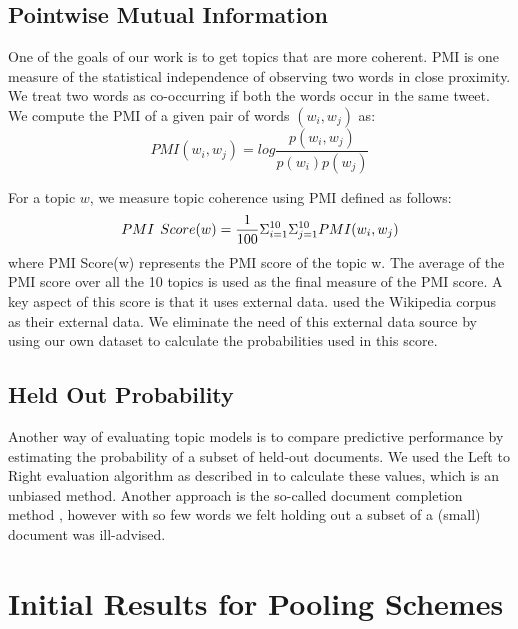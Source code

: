 \documentclass{sig-alternate}
\begin{document}
\subsection{Pointwise Mutual Information}

One of the goals of our work is to get topics that are more coherent. 
PMI is one measure of the statistical independence of observing  two words in close proximity. We treat two words as co-occurring if both the words occur in the same tweet. We compute the PMI of a given pair of words $(w_i, w_j)$ as:
\begin{equation}
PMI (w_i,w_j) = log \frac{p(w_i,w_j)}{p(w_i)p(w_j)}
\end{equation}

For a topic $w$, we measure topic coherence using PMI defined as follows:
\begin{equation*}
	PMI \hspace{1.5mm} Score(w) = \frac{1}{100}\Sigma_{i=1}^{10} \Sigma_{j=1}^{10} PMI(w_i,w_j)
\end{equation*}
where PMI Score(w) represents the PMI score of the topic w. The average of the PMI score over all the 10 topics is used as the final measure of the PMI score. A key aspect of this score is that it uses external data.  \cite{baldwin10} used the Wikipedia corpus as their external data. We eliminate the need of this external data source by using our own dataset to calculate the probabilities used in this score.

\subsection{Held Out Probability}
Another way of evaluating topic models is to compare predictive performance by estimating the probability of a subset of held-out documents.  We used the Left to Right evaluation algorithm as described in \cite{wallach} to calculate these values, 
which is an unbiased method.  Another approach is the so-called
document completion method \cite{wallach}, however with so few words we felt holding out a subset of a (small) document was ill-advised.


\section{Initial Results for Pooling Schemes}
\end{document}
